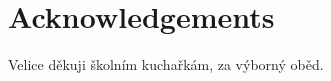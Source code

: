 ~\vfill{}

\section*{Acknowledgements}

Velice děkuji školním kuchařkám, za výborný oběd.

\vspace{2.5cm}

\newpage{}
